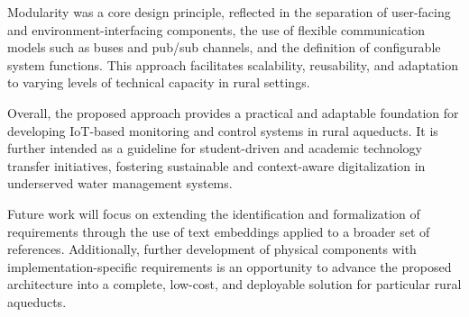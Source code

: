 \documentclass[conference]{IEEEtran}
\begin{document}
Modularity was a core design principle, reflected in the separation of user-facing and environment-interfacing components, the use of flexible communication models such as buses and pub/sub channels, and the definition of configurable system functions. This approach facilitates scalability, reusability, and adaptation to varying levels of technical capacity in rural settings.

Overall, the proposed approach provides a practical and adaptable foundation for developing IoT-based monitoring and control systems in rural aqueducts. It is further intended as a guideline for student-driven and academic technology transfer initiatives, fostering sustainable and context-aware digitalization in underserved water management systems.

Future work will focus on extending the identification and formalization of requirements through the use of text embeddings applied to a broader set of references. Additionally, further development of physical components with implementation-specific requirements is an opportunity to advance the proposed architecture into a complete, low-cost, and deployable solution for particular rural aqueducts.



\end{document}
